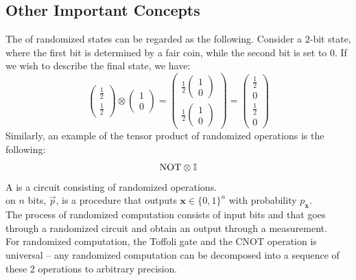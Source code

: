 \subsection{Other Important Concepts}
The  of randomized states can be regarded as the following. Consider a $2$-bit state, where the first bit is determined by a fair coin, while the second bit is set to $0$. If we wish to describe the final state, we have:
$$\begin{pmatrix}
    \frac{1}{2} \\ \frac{1}{2}
\end{pmatrix} \otimes \begin{pmatrix}
    1 \\ 0
\end{pmatrix} = \begin{pmatrix}
    \frac{1}{2} \begin{pmatrix}
        1 \\ 0
    \end{pmatrix} \\ \frac{1}{2} \begin{pmatrix}
        1 \\ 0
    \end{pmatrix}
\end{pmatrix} = \begin{pmatrix}
    \frac{1}{2} \\ 0 \\ \frac{1}{2} \\ 0
\end{pmatrix}$$
Similarly, an example of the tensor product of randomized operations is the following:
$$\text{NOT} \otimes \mathbb{I}$$
A  is a circuit consisting of randomized operations. \\
 on $n$ bits, $\vec{p}$, is a procedure that outputs $\mathbf{x} \in \{0, 1\}^n$ with probability $p_{\mathbf{x}}$. \\
The process of randomized computation consists of input bits and  that goes through a randomized circuit and obtain an output through a measurement. \\
For randomized computation, the Toffoli gate and the CNOT operation is universal -- any randomized computation can be decomposed into a sequence of these 2 operations to arbitrary precision.

\newpage
